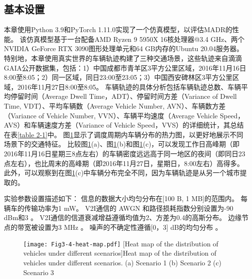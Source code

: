 \subsection{基本设置}
本章使用Python 3.9和PyTorch 1.11.0实现了一个仿真模型，以评估MADR的性能。
该仿真模型基于一台配备AMD Ryzen 9 5950X 16核处理器@3.4 GHz、两个NVIDIA GeForce RTX 3090图形处理单元和64 GB内存的Ubuntu 20.04服务器。
特别地，本章使用真实世界的车辆轨迹构建了三种交通场景，这些轨迹来自滴滴GAIA公开数据集，包括：1）中国成都市青羊区3平方公里区域，2016年11月16日8:00至8:05；2）同一区域，同日23:00至23:05；3）中国西安碑林区3平方公里区域，2016年11月27日8:00至8:05。
车辆轨迹的具体分析包括车辆轨迹总数、车辆平均停留时间（Average Dwell Time，ADT）、停留时间方差（Variance of Dwell Time, VDT）、平均车辆数（Average Vehicle Number, AVN）、车辆数方差（Variance of Vehicle Number, VVN）、车辆平均速度（Average Vehicle Speed，AVS）和车辆速度方差（Variance of Vehicle Speed，VVS）的详细统计，其总结在表\ref{table 2-1}中。
图\ref{fig 2-5}显示了调度周期内车辆分布的热力图，以更好地展示不同场景下的交通特征。
比较图\ref{fig 2-5}(a)、图\ref{fig 2-5}(b)和图\ref{fig 2-5}(c)，可以发现工作日高峰期（即2016年11月16日星期三8点左右）的车辆密度远远高于同一地区的夜间（即同日23点左右），也比周末的高峰期（即2016年11月27日，星期日，8:00左右）高得多。
此外，可以观察到在图\ref{fig 2-5}(c)中车辆分布完全不同，因为车辆轨迹是从另一个城市提取的。

实验参数设置描述如下：
信息的数据大小均匀分布在[100 B, 1 MB]的范围内。
每辆车的传输功率为1 mW。
V2I通信的 AWGN 和路径损耗指数分别设置为-90 dBm和3 \cite{sadek2009distributed}。
V2I通信的信道衰减增益遵循均值为2、方差为0.4的高斯分布。
边缘节点的带宽被设置为3 MHz \cite{wang2019delay}。
噪声的不确定性遵循[0，3] dB的均匀分布 \cite{tandra2008snr}。

\begin{table}[h]\small
\centering
{}
\label{table 2-1}
\end{table}

\begin{figure}[h]
\centering
  \texttt{[image: Fig3-4-heat-map.pdf]}
  [Heat map of the distribution of vehicles under different scenarios]{Heat map of the distribution of vehicles under different scenarios. (a) Scenario 1 (b) Scenario 2 (c) Scenario 3}
  \label{fig 2-5}
\end{figure} 

